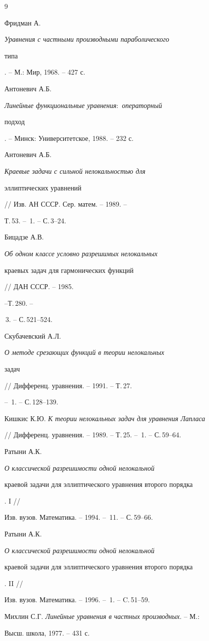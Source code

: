 \begin{thebibliography}{9} 


 




Фридман А. {\em Уравнения с частными производными параболического 


типа}. -- М.: Мир, 1968. -- 427 с. 




Антоневич А.Б. {\em Линейные функциональные уравнения$:$ операторный 


подход}. -- Минск: Университетское, 1988. -- 232 с. 




Антоневич А.Б. {\em Краевые задачи с сильной нелокальностью для 


эллиптических уравнений} // Изв. АН СССР. Сер. матем. -- 1989. -- 


Т.\,53. -- \No\,1. -- С.\,3--24. 




Бицадзе А.В. {\em Об одном классе условно разрешимых нелокальных 


краевых задач для гармонических функций} // ДАН СССР. -- 1985. 


--Т.\,280. -- 


\No\,3. -- С.\,521--524. 




Скубачевский А.Л. {\em О методе срезающих функций в теории нелокальных 


задач} // Дифференц. уравнения. -- 1991. -- Т.\,27. 


-- \No\,1. -- С.\,128--139.




Кишкис К.Ю. {\em К теории нелокальных задач для уравнения Лапласа} 


// Дифференц. уравнения. -- 1989. -- Т.\,25. -- \No\,1. -- С.\,59--64. 




Ратыни А.К. {\em О классической разрешимости одной нелокальной 


краевой задачи для эллиптического уравнения второго порядка}. I // 


Изв. вузов. Математика. -- 1994. -- \No\,11. -- С.\,59--66. 




Ратыни А.К. {\em О классической разрешимости одной нелокальной 


краевой задачи для эллиптического уравнения второго порядка}. II // 


Изв. вузов. Математика. -- 1996. -- \No\,1. -- C.\,51--59. 




Михлин С.Г. {\em Линейные уравнения в частных производных}. -- М.: 


Высш. школа, 1977. -- 431 с. 


 


\end{thebibliography} 


